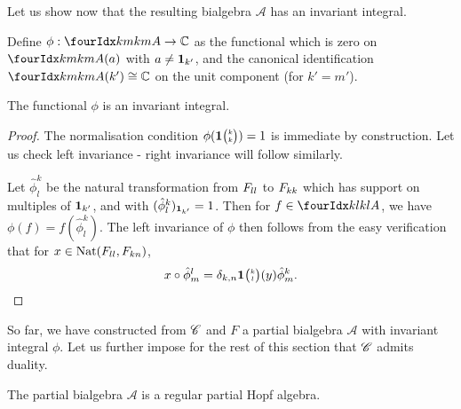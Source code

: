Let us show now that the resulting bialgebra $\mathscr{A}$ has an invariant integral.

\begin{Def} Define $\phi: \Gr{A}{k}{k}{m}{m} \rightarrow \C$ as the functional which is zero on $\Gr{A}{k}{k}{m}{m}(a)$ with $a\neq \mathbf{1}_{k'}$, and the canonical identification $\Gr{A}{k}{k}{m}{m}(k')\cong \C$ on the unit component (for $k'=m'$).
\end{Def}

\begin{Lem} The functional $\phi$ is an invariant integral.
\end{Lem}

\begin{proof} The normalisation condition $\phi(\mathbf{1}{\tiny {\begin{pmatrix} k\\k\end{pmatrix}}})=1$ is immediate by construction. Let us check left invariance - right invariance will follow similarly.

Let $\hat{\phi}^k_l$ be the natural transformation from $F_{ll}$ to $F_{kk}$ which has support on multiples of $\mathbf{1}_{k'}$, and with $(\hat{\phi}^k_l)_{\mathbf{1}_{k'}} = 1$.  Then for $f\in \Gr{A}{k}{k}{l}{l}$, we have $\phi(f) = f(\hat{\phi}^k_l)$. The left invariance of $\phi$ then follows from the easy verification that for $x\in \operatorname{\mathrm{Nat}}(F_{ll},F_{kn})$, \[x\circ \hat{\phi}^l_m =\delta_{k,n} \mathbf{1}{\tiny {\begin{pmatrix} k\\l\end{pmatrix}}}(y)\hat{\phi}^k_m.\] %
\end{proof}

So far, we have constructed from $\mathscr{C}$ and $F$ a partial bialgebra $\mathscr{A}$ with invariant integral $\phi$. Let us further impose for the rest of this section that $\mathscr{C}$ admits duality.

\begin{Prop}\label{PropAnti} The partial bialgebra $\mathscr{A}$ is a regular partial Hopf algebra.
\end{Prop} 

